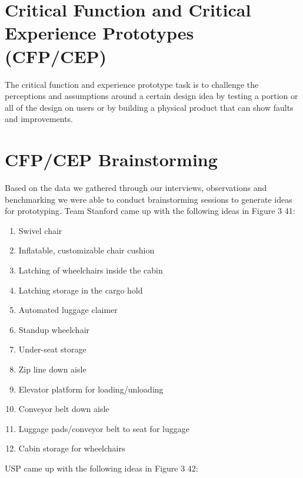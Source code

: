 \section*{Critical Function and Critical Experience Prototypes (CFP/CEP)}
The critical function and experience prototype task is to challenge the perceptions and assumptions around a certain design idea by testing a portion or all of the design on users or by building a physical product that can show faults and improvements.  

\section{CFP/CEP Brainstorming}

Based on the data we gathered through our interviews, observations and benchmarking we were able to conduct brainstorming sessions to generate ideas for prototyping. Team Stanford came up with the following ideas in Figure 3 41:
\begin{enumerate}
 \item{Swivel chair}
 \item{Inflatable, customizable chair cushion}
 \item{Latching of wheelchairs inside the cabin}
 \item{Latching storage in the cargo hold}
 \item{Automated luggage claimer}
 \item{Standup wheelchair}
 \item{Under-seat storage}
 \item{Zip line down aisle}
 \item{Elevator platform for loading/unloading}
 \item{Conveyor belt down aisle}
 \item{Luggage pads/conveyor belt to seat for luggage}
 \item{Cabin storage for wheelchairs}
\end{enumerate}
USP came up with the following ideas in Figure 3 42:
